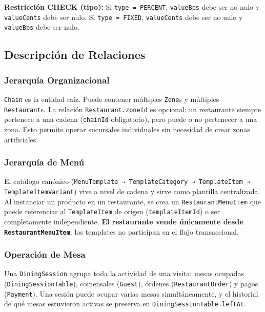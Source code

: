 \documentclass[12pt, letterpaper]{article}
\begin{document}
\noindent\textbf{Restricción CHECK (tipo):} Si \texttt{type = PERCENT}, \texttt{valueBps} debe ser no nulo y \texttt{valueCents} debe ser nulo. Si \texttt{type = FIXED}, \texttt{valueCents} debe ser no nulo y \texttt{valueBps} debe ser nulo.


\subsection{Descripción de Relaciones}

\subsubsection{Jerarquía Organizacional}

\texttt{Chain} es la entidad raíz. Puede contener múltiples \texttt{Zone}s y múltiples \texttt{Restaurant}s. La relación \texttt{Restaurant.zoneId} es opcional: un restaurante siempre pertenece a una cadena (\texttt{chainId} obligatorio), pero puede o no pertenecer a una zona. Esto permite operar sucursales individuales sin necesidad de crear zonas artificiales.

\subsubsection{Jerarquía de Menú}

El catálogo canónico (\texttt{MenuTemplate → TemplateCategory → TemplateItem → TemplateItemVariant}) vive a nivel de cadena y sirve como plantilla centralizada. Al instanciar un producto en un restaurante, se crea un \texttt{RestaurantMenuItem} que puede referenciar al \texttt{TemplateItem} de origen (\texttt{templateItemId}) o ser completamente independiente. \textbf{El restaurante vende únicamente desde \texttt{RestaurantMenuItem}}; los templates no participan en el flujo transaccional.

\subsubsection{Operación de Mesa}

Una \texttt{DiningSession} agrupa toda la actividad de una visita: mesas ocupadas (\texttt{DiningSessionTable}), comensales (\texttt{Guest}), órdenes (\texttt{RestaurantOrder}) y pagos (\texttt{Payment}). Una sesión puede ocupar varias mesas simultáneamente, y el historial de qué mesas estuvieron activas se preserva en \texttt{DiningSessionTable.leftAt}.
\end{document}

